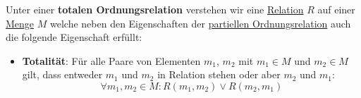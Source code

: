 \documentclass[../../main.tex]{subfiles}
\begin{document}
	\begin{definition}
		Unter einer \textbf{totalen Ordnungsrelation} verstehen wir eine \hyperref[def:Relation]{Relation} $R$ auf einer \hyperref[def:Menge]{Menge} $M$ welche neben den Eigenschaften der \hyperref[def:partielleOrdnungsrelation]{partiellen Ordnungsrelation} auch die folgende Eigenschaft erfüllt:
		\begin{itemize}
			\item \textbf{Totalität}: Für alle Paare von Elementen $m_1$, $m_2$ mit $m_1 \in M$ und $m_2 \in M$ gilt, dass entweder $m_1$ und $m_2$ in Relation stehen oder aber $m_2$ und $m_1$: $$\forall m_1, m_2 \in M: R(m_1,m_2) \lor R(m_2, m_1) $$
		\end{itemize}
	\end{definition}
	
\end{document}
